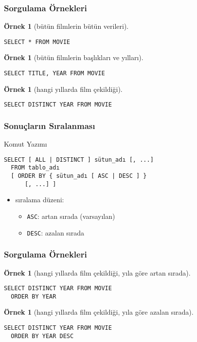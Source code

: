\documentclass[dvipsnames]{beamer}
\theoremstyle{definition}
\theoremstyle{example}
\newtheorem{ornek}[theorem]{Örnek}
\theoremstyle{plain}
\begin{document}
\begin{frame}[fragile]
  \frametitle{Sorgulama Örnekleri}

  \begin{ornek}[bütün filmlerin bütün verileri]
    \begin{lstlisting}
SELECT * FROM MOVIE
    \end{lstlisting}
  \end{ornek}

  \pause
  \begin{ornek}[bütün filmlerin başlıkları ve yılları]
    \begin{lstlisting}
SELECT TITLE, YEAR FROM MOVIE
    \end{lstlisting}
  \end{ornek}

  \pause
  \begin{ornek}[hangi yıllarda film çekildiği]
    \begin{lstlisting}
SELECT DISTINCT YEAR FROM MOVIE
    \end{lstlisting}
  \end{ornek}
\end{frame}

\begin{frame}[fragile]
  \frametitle{Sonuçların Sıralanması}

  \begin{block}{Komut Yazımı}
    \begin{lstlisting}
SELECT [ ALL | DISTINCT ] sütun_adı [, ...]
  FROM tablo_adı
  [ ORDER BY { sütun_adı [ ASC | DESC ] }
      [, ...] ]
    \end{lstlisting}
  \end{block}

  \pause
  \begin{itemize}
    \item sıralama düzeni:
    \begin{itemize}
      \item \lstinline!ASC!: artan sırada (varsayılan)
      \item \lstinline!DESC!: azalan sırada
    \end{itemize}
  \end{itemize}
\end{frame}

\begin{frame}[fragile]
  \frametitle{Sorgulama Örnekleri}

  \begin{ornek}[hangi yıllarda film çekildiği, yıla göre artan sırada]
    \begin{lstlisting}
SELECT DISTINCT YEAR FROM MOVIE
  ORDER BY YEAR
    \end{lstlisting}
  \end{ornek}

  \pause
  \begin{ornek}[hangi yıllarda film çekildiği, yıla göre azalan sırada]
    \begin{lstlisting}
SELECT DISTINCT YEAR FROM MOVIE
  ORDER BY YEAR DESC
    \end{lstlisting}
  \end{ornek}
\end{frame}
\end{document}
